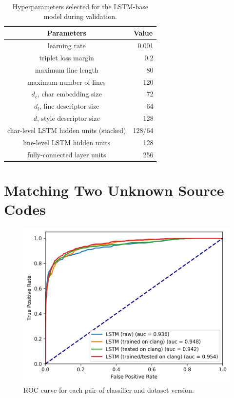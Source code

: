 \begin{table}[htbp]
	\centering
	\begin{tabular}{c|r}
		\hline
		\textbf{Parameters}           & \multicolumn{1}{c}{\textbf{Value}} \\ \hline
		learning rate   & 0.001                        \\ \hline
		triplet loss margin   & 0.2                        \\ \hline
		maximum line length   & 80                        \\ \hline
		maximum number of lines   & 120                            \\ \hline
		$d_c$, char embedding size   & 72                           \\ \hline
		$d_l$, line descriptor size  & 64                            \\ \hline
		$d$, style descriptor size & 128                            \\ \hline
		char-level LSTM hidden units (stacked) & 128/64                            \\ \hline
		line-level LSTM hidden units & 128                            \\ \hline
		fully-connected layer units  & 256                            \\ \hline
	\end{tabular}
	\caption{Hyperparameters selected for the LSTM-base model during validation.}
	\label{tab:lstm_hyper}
\end{table}

\section{Matching Two Unknown Source Codes}

\begin{figure}[ht]
	\centering
	\includegraphics[width=0.7\linewidth]{imgs/roc_complete.png}
	\caption{ROC curve for each pair of classifier and dataset version.}
	\label{fig:roc_complete}
\end{figure}

